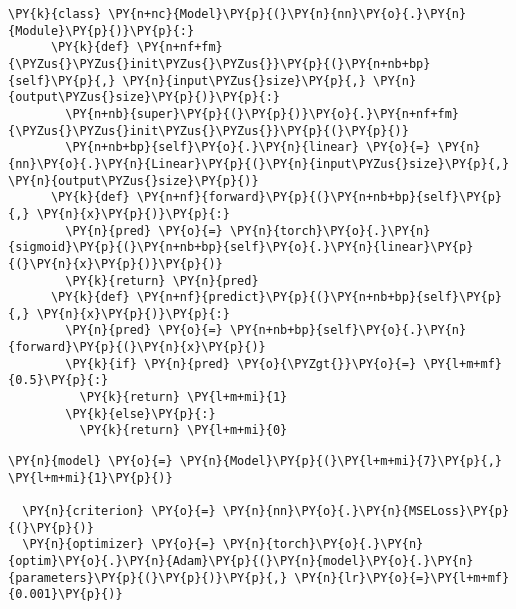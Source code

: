       \begin{tcolorbox}[breakable, size=fbox, boxrule=1pt, pad at break*=1mm,colback=cellbackground, colframe=cellborder]
  \begin{Verbatim}[commandchars=\\\{\}]
  \PY{k}{class} \PY{n+nc}{Model}\PY{p}{(}\PY{n}{nn}\PY{o}{.}\PY{n}{Module}\PY{p}{)}\PY{p}{:}
      \PY{k}{def} \PY{n+nf+fm}{\PYZus{}\PYZus{}init\PYZus{}\PYZus{}}\PY{p}{(}\PY{n+nb+bp}{self}\PY{p}{,} \PY{n}{input\PYZus{}size}\PY{p}{,} \PY{n}{output\PYZus{}size}\PY{p}{)}\PY{p}{:}
        \PY{n+nb}{super}\PY{p}{(}\PY{p}{)}\PY{o}{.}\PY{n+nf+fm}{\PYZus{}\PYZus{}init\PYZus{}\PYZus{}}\PY{p}{(}\PY{p}{)} 
        \PY{n+nb+bp}{self}\PY{o}{.}\PY{n}{linear} \PY{o}{=} \PY{n}{nn}\PY{o}{.}\PY{n}{Linear}\PY{p}{(}\PY{n}{input\PYZus{}size}\PY{p}{,} \PY{n}{output\PYZus{}size}\PY{p}{)}
      \PY{k}{def} \PY{n+nf}{forward}\PY{p}{(}\PY{n+nb+bp}{self}\PY{p}{,} \PY{n}{x}\PY{p}{)}\PY{p}{:}
        \PY{n}{pred} \PY{o}{=} \PY{n}{torch}\PY{o}{.}\PY{n}{sigmoid}\PY{p}{(}\PY{n+nb+bp}{self}\PY{o}{.}\PY{n}{linear}\PY{p}{(}\PY{n}{x}\PY{p}{)}\PY{p}{)}
        \PY{k}{return} \PY{n}{pred}
      \PY{k}{def} \PY{n+nf}{predict}\PY{p}{(}\PY{n+nb+bp}{self}\PY{p}{,} \PY{n}{x}\PY{p}{)}\PY{p}{:}
        \PY{n}{pred} \PY{o}{=} \PY{n+nb+bp}{self}\PY{o}{.}\PY{n}{forward}\PY{p}{(}\PY{n}{x}\PY{p}{)}
        \PY{k}{if} \PY{n}{pred} \PY{o}{\PYZgt{}}\PY{o}{=} \PY{l+m+mf}{0.5}\PY{p}{:}
          \PY{k}{return} \PY{l+m+mi}{1}
        \PY{k}{else}\PY{p}{:}
          \PY{k}{return} \PY{l+m+mi}{0}
  \end{Verbatim}
  \end{tcolorbox}

      \begin{tcolorbox}[breakable, size=fbox, boxrule=1pt, pad at break*=1mm,colback=cellbackground, colframe=cellborder]
  \begin{Verbatim}[commandchars=\\\{\}]
  \PY{n}{model} \PY{o}{=} \PY{n}{Model}\PY{p}{(}\PY{l+m+mi}{7}\PY{p}{,} \PY{l+m+mi}{1}\PY{p}{)}

  \PY{n}{criterion} \PY{o}{=} \PY{n}{nn}\PY{o}{.}\PY{n}{MSELoss}\PY{p}{(}\PY{p}{)}
  \PY{n}{optimizer} \PY{o}{=} \PY{n}{torch}\PY{o}{.}\PY{n}{optim}\PY{o}{.}\PY{n}{Adam}\PY{p}{(}\PY{n}{model}\PY{o}{.}\PY{n}{parameters}\PY{p}{(}\PY{p}{)}\PY{p}{,} \PY{n}{lr}\PY{o}{=}\PY{l+m+mf}{0.001}\PY{p}{)}
  \end{Verbatim}
  \end{tcolorbox}

